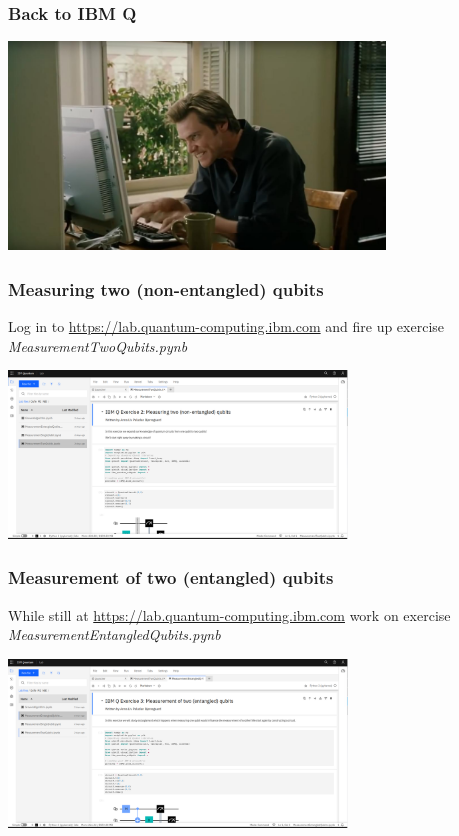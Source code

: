 \documentclass[10pt]{beamer}
\begin{document}
\begin{frame}
  \frametitle{Back to IBM Q}
  \centering
  \includegraphics[width=10cm]{img/typing.jpg}
\end{frame}

\begin{frame}
  \frametitle{Measuring two (non-entangled) qubits}
  Log in to \href{https://lab.quantum-computing.ibm.com}{https://lab.quantum-computing.ibm.com} and fire up exercise \emph{MeasurementTwoQubits.pynb}

  \begin{center}
\includegraphics[width=9cm]{img/ibmq-two-qubit.png}
    \end{center}
\end{frame}

\begin{frame}
  \frametitle{Measurement of two (entangled) qubits}
While still at \href{https://lab.quantum-computing.ibm.com}{https://lab.quantum-computing.ibm.com} work on exercise \emph{MeasurementEntangledQubits.pynb}

  \begin{center}
\includegraphics[width=9cm]{img/ibmq-entangled-qubits.png}
    \end{center}
\end{frame}
\end{document}
